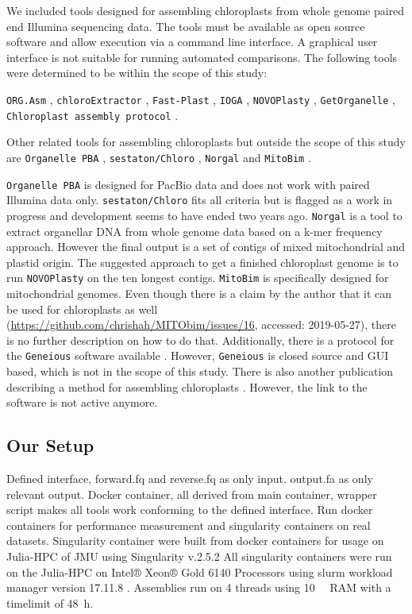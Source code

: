 \documentclass{bmcart}
\newcommand{\formatprogramnames}[1]{\texttt{#1}}
\newcommand{\ce}{\formatprogramnames{chloroExtractor}}
\newcommand{\oa}{\formatprogramnames{ORG.Asm}}
\newcommand{\fp}{\formatprogramnames{Fast-Plast}}
\newcommand{\ioga}{\formatprogramnames{IOGA}}
\newcommand{\np}{\formatprogramnames{NOVOPlasty}}
\newcommand{\go}{\formatprogramnames{GetOrganelle}}
\newcommand{\cassp}{\formatprogramnames{Chloroplast assembly protocol}}
\begin{document}
We included tools designed for assembling chloroplasts from whole genome paired end Illumina sequencing data. The tools must be available as open source software and allow execution via a command line interface. A graphical user interface is not suitable for
running automated comparisons. The following tools were determined to be within the scope of this study:

\oa{} \cite{coissac_barcodes_2016}, 
\ce{} \cite{j_ankenbrand_chloroextractor:_2018}, 
\fp{} \cite{mckain__fast-plast_2017}, 
\ioga{} \cite{bakker_herbarium_2016}, 
\np{} \cite{dierckxsens_novoplasty:_2017}, 
\go{} \cite{jin_getorganelle:_2018}, 
\cassp{} \cite{sancho_comparative_2018}.

Other related tools for assembling chloroplasts but outside the scope of this study are \texttt{Organelle PBA} \cite{Soorni2017}, \texttt{sestaton/Chloro} \cite{sestaton}, \texttt{Norgal}  \cite{Al-Nakeeb2017} and \texttt{MitoBim} \cite{mitobim2013}.

\texttt{Organelle PBA} is designed for PacBio data and does not work with paired Illumina data only.
\texttt{sestaton/Chloro} fits all criteria but is flagged as a work in progress and development seems to have ended two years ago.
\texttt{Norgal} is a tool to extract organellar DNA from whole genome data based on a k-mer frequency approach. However the final output is a set of contigs of mixed mitochondrial and plastid origin. The suggested approach to get a finished chloroplast genome is to run \np{} on the ten longest contigs.
\texttt{MitoBim} is specifically designed for mitochondrial genomes. Even though there is a claim by the author that it can be used for chloroplasts as well (\url{https://github.com/chrishah/MITObim/issues/16}, accessed: 2019-05-27), there is no further description on how to do that. 
Additionally, there is a protocol for the \texttt{Geneious} \cite{geneious} software available \cite{geneious-protocol}.
However, \texttt{Geneious} is closed source and GUI based, which is not in the scope of this study.
There is also another publication describing a method for assembling chloroplasts \cite{method-description-paper}. However, the link to the software is not active anymore.


\subsection*{Our Setup}
Defined interface, forward.fq and reverse.fq as only input. output.fa as only relevant output.
Docker container, all derived from main container, wrapper script makes all tools work conforming to the defined interface. Run docker containers for performance measurement and singularity containers on real datasets.
Singularity container were built from docker containers for usage on Julia-HPC of JMU using Singularity v.2.5.2 \cite{kurtzer2017singularity}
All singularity containers were run on the Julia-HPC on Intel® Xeon® Gold \num{6140} Processors using slurm workload manager version 17.11.8 \cite{Jette02slurm}. Assemblies run on \num{4} threads using \SI{10}{\gibi\byte} RAM with a timelimit of \SI{48}{\hour}. 
\end{document}
